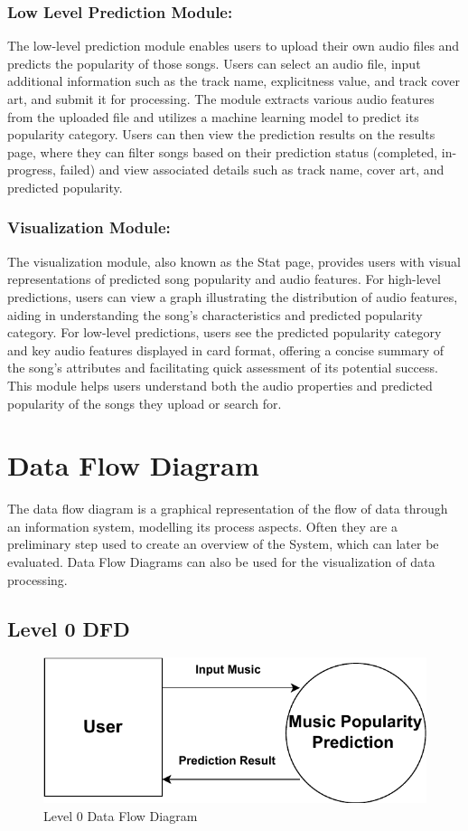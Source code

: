 \documentclass[11pt]{report}
\begin{document}
\subsection*{Low Level Prediction Module:}
The low-level prediction module enables users to upload their own audio files and predicts the popularity of those songs. Users can select an audio file, input additional information such as the track name, explicitness value, and track cover art, and submit it for processing. The module extracts various audio features from the uploaded file and utilizes a machine learning model to predict its popularity category. Users can then view the prediction results on the results page, where they can filter songs based on their prediction status (completed, in-progress, failed) and view associated details such as track name, cover art, and predicted popularity.

\subsection*{Visualization Module:}
The visualization module, also known as the Stat page, provides users with visual representations of predicted song popularity and audio features. For high-level predictions, users can view a graph illustrating the distribution of audio features, aiding in understanding the song's characteristics and predicted popularity category. For low-level predictions, users see the predicted popularity category and key audio features displayed in card format, offering a concise summary of the song's attributes and facilitating quick assessment of its potential success. This module helps users understand both the audio properties and predicted popularity of the songs they upload or search for.

\chapter{Data Flow Diagram}
The data flow diagram is a graphical representation of the flow of data through an information system, modelling its process aspects. Often they are a preliminary step used to create an overview of the System, which can later be evaluated. Data Flow Diagrams can also be used for the visualization of data processing.

\section{Level 0 DFD}
\begin{figure}[h]
    \centering
     \includegraphics[scale=1]{PDF/DFD0.pdf}
    \caption{Level 0 Data Flow Diagram}
\end{figure}
\end{document}
